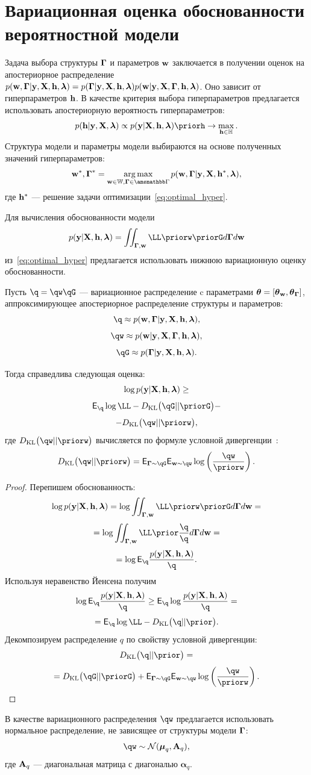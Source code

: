 \section{Вариационная оценка обоснованности вероятностной модели}
Задача выбора структуры $\boldsymbol{\Gamma}$ и параметров $\mathbf{w}$ заключается в получении оценок на апостериорное распределение $p(\mathbf{w}, \boldsymbol{\Gamma}|\mathbf{y}, \mathbf{X}, \mathbf{h},\boldsymbol{\lambda}) = p(\boldsymbol{\Gamma}|\mathbf{y}, \mathbf{X}, \mathbf{h},\boldsymbol{\lambda})p(\mathbf{w}|\mathbf{y}, \mathbf{X}, \boldsymbol{\Gamma}, \mathbf{h},\boldsymbol{\lambda})$. Оно зависит от гиперпараметров $\mathbf{h}$. 
В качестве критерия выбора гиперпараметров предлагается использовать апостериорную вероятность гиперпараметров:
\begin{equation}
\label{eq:optimal_hyper}
    \posth \propto \EV \priorh \to \max_{\h \in \Hb}.
\end{equation}
Структура модели и параметры модели выбираются на основе полученных значений гиперпараметров:
\[
    \w^*,\G^* = \argmax_{\w \in \Wb, \G \in \Gb} p(\w, \G|\y, \X, \h^*, \lam ),
\]
где $\mathbf{h}^*$ --- решение задачи оптимизации~\eqref{eq:optimal_hyper}.

Для вычисления обоснованности модели $$\EV = \iint_{\G, \w}\LL \priorw \priorG d\G d\w$$ из~\eqref{eq:optimal_hyper} предлагается использовать нижнюю вариационную оценку обоснованности.

\begin{theorem}
Пусть $\q = \qw \qG$ --- вариационное распределение c параметрами $\boldsymbol{\theta}= [\boldsymbol{\theta}_\mathbf{w}, \boldsymbol{\theta}_{\boldsymbol{\Gamma}} ]$, аппроксимирующее апостериорное распределение структуры и параметров:
\[
    \q \approx \post,
\]
\[
    \qw  \approx \postw,
\]
\[
    \qG \approx \postG.
\]

Тогда справедлива следующая оценка:
\begin{equation}
\label{eq:full_elbo}
\log p(\mathbf{y}|\mathbf{X}, \mathbf{h},\boldsymbol{\lambda}) \geq
\end{equation}
\[
 \E_{\q}  \log \LL - \KL{\qG}{\priorG} - 
\]
\[
 - \KL{\qw}{\priorw},
\]
где $\KL{\qw}{\priorw}$ вычисляется по формуле условной дивергенции~\cite{TODO}:
\[
\KL{\qw}{\priorw} = \E_{\G \sim \qG} \E_{\w \sim \qw} \log \left(\frac{\qw}{\priorw}\right).
\]
\end{theorem}

\begin{proof}
Перепишем обоснованность:
\[
\log \EV  =  \log \iint_{\G,\w} \LL \priorw \priorG d\G d\w  =
\]
\[
   = \log\iint_{\G,\w} \LL \prior  \frac{\q}{\q}d\G d\w =
\]
\[
  =  \log \E_{\q} \frac{\EV}{\q}.
\]
Используя неравенство Йенсена получим 
\[
 \log \E_{\q} \frac{\EV}{\q} \geq  \E_{\q}\log \frac{\EV}{\q} = 
\]
\[
 =  \E_{\q} \log \LL - \KL{\q}{\prior}.
\]
Декомпозируем распределение $q$ по свойству условной дивергенции:
\[
\KL{\q}{\prior} = 
\]
\begin{equation}
\label{eq:kl_full}
= \KL{\qG}{\priorG} + \E_{\G \sim \qG} \E_{\w \sim \qw} \log \left(\frac{\qw}{\priorw}\right).    
\end{equation}
\end{proof}
В качестве вариационного распределения $\qw$ предлагается использовать нормальное распределение, не зависящее от структуры модели $\boldsymbol{\Gamma}$:
\[
    \qw  \sim \mathcal{N}(\boldsymbol{\mu}_q, \A_q), 
\]
где $\mathbf{A}_q$ --- диагональная матрица с диагональю $\boldsymbol{\alpha}_q$.

